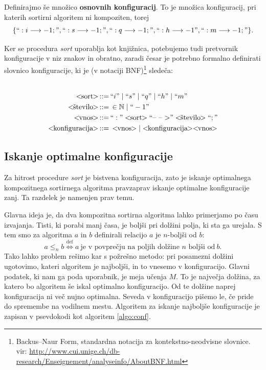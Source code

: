 \documentclass[a4paper,oneside,12pt]{article}
\def\N{\mathbb N}
\def\ali{\;|\;}
\newenvironment{BNF}{
    \\
    \Sbox
    \minipage{12cm}
}{
    \endminipage
    \endSbox
    \minipage{\textwidth}
    \vspace*{5pt}
    \begin{center}
        \fcolorbox{white}{white}{
            \TheSbox
        }
    \end{center}
    \vspace*{5pt}
    \endminipage
}
\def\bnfassign:{\,::=&\,}
\newcommand{\q}[1]{\text{``}#1\text{''}}
\newcommand{\ntm}[1]{\ensuremath{<\!\!\text{#1}\!\!>}}
\newcommand{\abnf}[2]{\ensuremath{\ntm{#1} \bnfassign: #2}}
\newcommand{\lra}{\ensuremath{\longrightarrow}}
\begin{document}

Definirajmo še množico \textbf{osnovnih konfiguracij}. To je množica konfiguracij, pri katerih
sortirni algoritem ni kompoziten, torej 
\[ \{``:i \lra -1;", ``:s \lra -1;", 
``:q \lra -1;", ``:h \lra -1", ``:m \lra -1;"\}. \]

Ker se procedura \emph{sort} uporablja kot knjižnica, potebujemo tudi pretvornik
konfiguracije v niz znakov in obratno, zaradi česar je potrebno formalno definirati slovnico
konfiguracije, ki je (v notaciji BNF)\footnote{
Backus--Naur Form, standardna notacija za kontekstno-neodvisne slovnice.\\
vir: \url{http://www.cui.unige.ch/db-research/Enseignement/analyseinfo/AboutBNF.html}} 
sledeča:
\\
\begin{BNF}
  \begin{align*}
    \abnf{sort}{\q{i} \ali \q{s} \ali \q{q} \ali \q{h} \ali \q{m}}\\
    \abnf{število}{\in \N \ali \q{-1}} \\
    \abnf{vnos}{\q{:}\ntm{sort}\q{\mbox{--}\ \mbox{--}\ \mbox{$>$}}\ntm{število}\q{;}}\\
    \abnf{konfiguracija}{\ntm{vnos} | \ntm{konfiguracija}\ntm{vnos}}
  \end{align*}
\end{BNF}

\subsection{Iskanje optimalne konfiguracije}
\label{chapter:optimalconf}
Za hitrost procedure \emph{sort} je bistvena konfiguracija,
zato je iskanje optimalnega kompozitnega sortirnega algoritma pravzaprav iskanje optimalne
konfiguracije zanj. Ta razdelek je namenjen prav temu.  

Glavna ideja je, da dva kompozitna sortirna algoritma lahko primerjamo po času 
izvajanja. Tisti, ki porabi manj časa, je boljši pri dolžini polja, ki sta
ga urejala. S tem smo za algoritma $a$ in $b$ definirali relacijo $a$ je $n$-boljši od $b$:
\[ a \leq_n b \overset{\text{def}}{\Longleftrightarrow} a\ \text{je v povprečju na poljih dolžine $n$ boljši
od}\ b.\]
Tako lahko problem rešimo kar s požrešno metodo: 
pri posamezni dolžini ugotovimo, kateri algoritem je najboljši, in to vnesemo
v konfiguracijo. Glavni podatek, ki nam ga poda uporabnik, je meja učenja $M$. To je
največja dolžina, za katero bo algoritem še iskal optimalno konfiguracijo. Od te dolžine naprej
konfiguracija ni več nujno optimalna. Seveda v konfiguracijo pišemo le, če pride do 
spremembe na vodilnem mestu. Algoritem za iskanje najboljše konfiguracije je zapisan v
psevdokodi kot algoritem \ref{algo:conf}.
\end{document}
